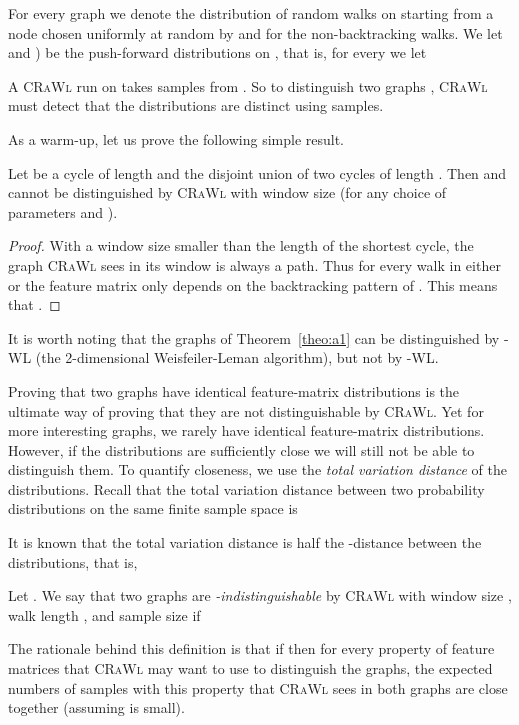 \documentclass{scrartcl} \usepackage[dvipsnames]{xcolor}
\newcommand{\crawl}{\textsc{CRaWl}}
\begin{document}
For every graph  we denote the distribution of random walks on 
starting from a node chosen uniformly at random by  and
 for the
non-backtracking walks. We let
 and ) be the push-forward distributions on
, that is, for every
 we let

A \crawl{} run on  takes  samples from . So to
distinguish two graphs , \crawl{} must detect that the
distributions  are distinct using  samples.

As a warm-up, let us prove the following simple result.
\setcounter{theorem}{1}
\begin{theorem}\label{theo:a1}
  Let  be a cycle of length  and  the disjoint union of two
  cycles of length . Then  and
   cannot be distinguished by \crawl{} with window size 
  (for any choice of parameters  and ).
\end{theorem}

\begin{proof}
  With a window size smaller than the length of the shortest
  cycle, the graph \crawl{} sees in its window is always a path. Thus for every walk  in either  or 
  the feature matrix  only depends on the backtracking pattern
  of . This means that  .
\end{proof}

It is worth noting that the graphs  of Theorem~\ref{theo:a1} can
be distinguished by -WL (the 2-dimensional Weisfeiler-Leman
algorithm), but not by -WL.

Proving that two graphs  have identical feature-matrix distributions
 is the ultimate way of proving that they are not
distinguishable by \crawl{}. Yet for more interesting graphs, we rarely
have identical feature-matrix distributions. However, if the
distributions are sufficiently close we will still not be able to
distinguish them. To quantify closeness, we use the \emph{total variation
distance} of the distributions. Recall that the total variation distance between two
probability distributions  on the same finite sample space
 is

It is known that the total variation distance is half the
-distance between the distributions, that is,

Let . We say that two graphs  are
\emph{-indistinguishable} by \crawl{} with window size ,
walk length , and sample size  if

The rationale behind this definition is that if
 then for every
property of feature matrices that \crawl{} may want to use to
distinguish the graphs, the expected numbers of samples with this
property that \crawl{} sees in both graphs are close together
(assuming  is small).
\end{document}
